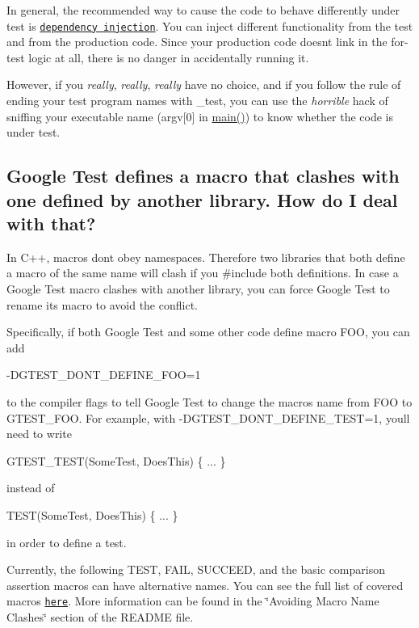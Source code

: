 In general, the recommended way to cause the code to behave differently under test is \href{http://jamesshore.com/Blog/Dependency-Injection-Demystified.html}{\tt dependency injection}. You can inject different functionality from the test and from the production code. Since your production code doesn\textquotesingle{}t link in the for-\/test logic at all, there is no danger in accidentally running it.

However, if you {\itshape really}, {\itshape really}, {\itshape really} have no choice, and if you follow the rule of ending your test program names with {\ttfamily \+\_\+test}, you can use the {\itshape horrible} hack of sniffing your executable name ({\ttfamily argv\mbox{[}0\mbox{]}} in {\ttfamily \hyperlink{app_2main_8cpp_ae66f6b31b5ad750f1fe042a706a4e3d4}{main()}}) to know whether the code is under test.

\subsection*{Google Test defines a macro that clashes with one defined by another library. How do I deal with that?}

In C++, macros don\textquotesingle{}t obey namespaces. Therefore two libraries that both define a macro of the same name will clash if you {\ttfamily \#include} both definitions. In case a Google Test macro clashes with another library, you can force Google Test to rename its macro to avoid the conflict.

Specifically, if both Google Test and some other code define macro {\ttfamily F\+OO}, you can add 
\begin{DoxyCode}
-DGTEST\_DONT\_DEFINE\_FOO=1
\end{DoxyCode}
 to the compiler flags to tell Google Test to change the macro\textquotesingle{}s name from {\ttfamily F\+OO} to {\ttfamily G\+T\+E\+S\+T\+\_\+\+F\+OO}. For example, with {\ttfamily -\/\+D\+G\+T\+E\+S\+T\+\_\+\+D\+O\+N\+T\+\_\+\+D\+E\+F\+I\+N\+E\+\_\+\+T\+E\+ST=1}, you\textquotesingle{}ll need to write 
\begin{DoxyCode}
GTEST\_TEST(SomeTest, DoesThis) \{ ... \}
\end{DoxyCode}
 instead of 
\begin{DoxyCode}
TEST(SomeTest, DoesThis) \{ ... \}
\end{DoxyCode}
 in order to define a test.

Currently, the following {\ttfamily T\+E\+ST}, {\ttfamily F\+A\+IL}, {\ttfamily S\+U\+C\+C\+E\+ED}, and the basic comparison assertion macros can have alternative names. You can see the full list of covered macros \href{http://www.google.com/codesearch?q=if+!GTEST_DONT_DEFINE_\w%2B+package:http://googletest\.googlecode\.com+file:/include/gtest/gtest.h}{\tt here}. More information can be found in the \char`\"{}\+Avoiding Macro Name Clashes\char`\"{} section of the R\+E\+A\+D\+ME file.

